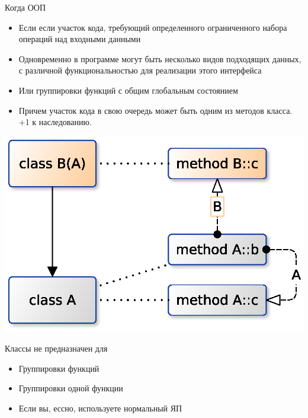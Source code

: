 \documentclass{article}
\begin{document}
\begin{center} Когда ООП \end{center}
\begin{itemize}
    \item Если если участок кода, требующий определенного ограниченного 
          набора операций над входными данными
    \item Одновременно в программе могут быть несколько видов подходящих данных, 
          с различной функциональностью для реализации этого интерфейса
    \item Или группировки функций с общим глобальным состоянием
    \item Причем участок кода в свою очередь может быть одним из методов класса.
          +1 к наследованию.
\end{itemize}
\newpage
\begin{center} \includegraphics{images/virt_hierarchi.eps} \end{center} 
\newpage

\begin{center} Классы не предназначен для \end{center}
\begin{itemize}
    \item Группировки функций
    \item Группировки одной функции
    \item Если вы, ессно, используете нормальный ЯП
\end{itemize}
\newpage
\end{document}
